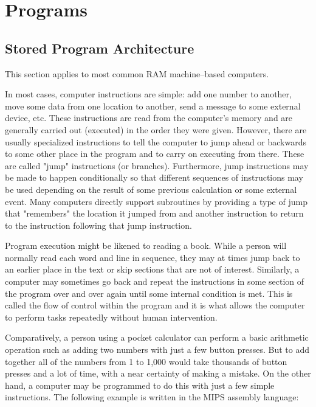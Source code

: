 \documentclass[a4paper,11pt]{article}
\begin{document}
\section{Programs}
\subsection{Stored Program Architecture}
This section applies to most common RAM machine–based computers.

In most cases, computer instructions are simple: add one number to another, move some data from one location to another, send a message to some external device, etc. These instructions are read from the computer's memory and are generally carried out (executed) in the order they were given. However, there are usually specialized instructions to tell the computer to jump ahead or backwards to some other place in the program and to carry on executing from there. These are called "jump" instructions (or branches). Furthermore, jump instructions may be made to happen conditionally so that different sequences of instructions may be used depending on the result of some previous calculation or some external event. Many computers directly support subroutines by providing a type of jump that "remembers" the location it jumped from and another instruction to return to the instruction following that jump instruction.

Program execution might be likened to reading a book. While a person will normally read each word and line in sequence, they may at times jump back to an earlier place in the text or skip sections that are not of interest. Similarly, a computer may sometimes go back and repeat the instructions in some section of the program over and over again until some internal condition is met. This is called the flow of control within the program and it is what allows the computer to perform tasks repeatedly without human intervention.

Comparatively, a person using a pocket calculator can perform a basic arithmetic operation such as adding two numbers with just a few button presses. But to add together all of the numbers from 1 to 1,000 would take thousands of button presses and a lot of time, with a near certainty of making a mistake. On the other hand, a computer may be programmed to do this with just a few simple instructions. The following example is written in the MIPS assembly language:
\end{document}
